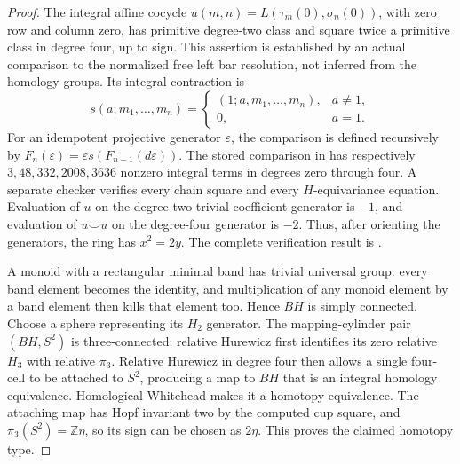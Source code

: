 \begin{proof}
The integral affine cocycle
$u(m,n)=L(\tau_m(0),\sigma_n(0))$, with zero row and column zero,
has primitive degree-two class and square twice a primitive
class in degree four, up to sign.  This assertion is established by
an actual comparison to the normalized free left bar resolution,
not inferred from the homology groups.  Its integral contraction is
\[
 s(a;m_1,\ldots,m_n)=
 \begin{cases}
 (1;a,m_1,\ldots,m_n),&a\ne1,\\
 0,&a=1.
 \end{cases}
\]
For an idempotent projective generator $\varepsilon$, the comparison
is defined recursively by
$F_n(\varepsilon)=\varepsilon s(F_{n-1}(d\varepsilon))$.
The stored comparison in
has respectively $3,48,332,2008,3636$ nonzero integral terms in
degrees zero through four.  A separate checker verifies every chain
square and every $H$-equivariance equation.  Evaluation of $u$ on the
degree-two trivial-coefficient generator is $-1$, and evaluation of
$u\smile u$ on the degree-four generator is $-2$.
Thus, after orienting the generators, the ring has $x^2=2y$.
The complete verification result is
.

A monoid with a rectangular minimal band has trivial universal group:
every band element becomes the identity, and multiplication of any
monoid element by a band element then kills that element too.
Hence $BH$ is simply connected.  Choose a sphere representing its
$H_2$ generator.  The mapping-cylinder pair $(BH,S^2)$ is
three-connected: relative Hurewicz first identifies its zero relative
$H_3$ with relative $\pi_3$.  Relative Hurewicz in degree four then
allows a single four-cell to be attached to $S^2$, producing a map
to $BH$ that is an integral homology equivalence.  Homological
Whitehead makes it a homotopy equivalence.  The attaching map has
Hopf invariant two by the computed cup square, and
$\pi_3(S^2)=\mathbb Z\eta$, so its sign can be chosen as $2\eta$.
This proves the claimed homotopy type.
\end{proof}

